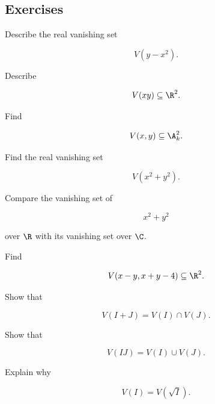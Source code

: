 \subsection{Exercises}
\label{subsec:algebraic-geometry-exercises}

\begin{exercise}[1]
Describe the real vanishing set

\[
V(y-x^2).
\]
\end{exercise}

\begin{exercise}[1]
Describe

\[
V(xy)
\subseteq\R^2.
\]
\end{exercise}

\begin{exercise}[1]
Find

\[
V(x,y)
\subseteq\A^2_k.
\]
\end{exercise}

\begin{exercise}[1]
Find the real vanishing set

\[
V(x^2+y^2).
\]
\end{exercise}

\begin{exercise}[2]
Compare the vanishing set of

\[
x^2+y^2
\]

over \(\R\) with its vanishing set over \(\C\).
\end{exercise}

\begin{exercise}[2]
Find

\[
V(x-y,x+y-4)
\subseteq\R^2.
\]
\end{exercise}

\begin{exercise}[2]
Show that

\[
V(I+J)=V(I)\cap V(J).
\]
\end{exercise}

\begin{exercise}[2]
Show that

\[
V(IJ)=V(I)\cup V(J).
\]
\end{exercise}

\begin{exercise}[2]
Explain why

\[
V(I)=V(\sqrt{I}).
\]
\end{exercise}


